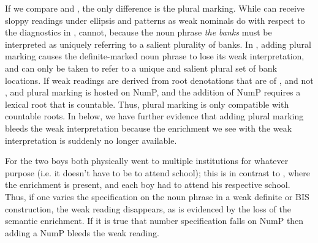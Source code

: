 \documentclass[output=paper,
modfonts
]{langscibook}
\begin{document}
\begin{exe}
\end{exe}

If we compare  and , the only difference is the plural marking. While  can receive sloppy readings under ellipsis and patterns as weak nominals do with respect to the diagnostics in ,  cannot, because the noun phrase \textit{the banks} must be interpreted as uniquely referring to a salient plurality of banks. In , adding plural marking causes the definite-marked noun phrase to lose its weak interpretation, and can only be taken to refer to a unique and salient plural set of bank locations. If weak readings are derived from root denotations that are  of , and not , and plural marking is hosted on NumP, and the addition of NumP requires a lexical root that is countable. Thus, plural marking is only compatible with countable roots. In  below, we have further evidence that adding plural marking bleeds the weak interpretation because the enrichment we see with the weak interpretation is suddenly no longer available. 

\begin{exe}
\end{exe}

For  the two boys both physically went to multiple institutions for whatever purpose (i.e. it doesn't have to be to attend school); this is in contrast to , where the enrichment is present, and each boy had to attend his respective school. Thus, if one varies the  specification on the noun phrase in a weak definite or BIS construction, the weak reading disappears, as is evidenced by the loss of the semantic enrichment. If it is true that number specification falls on NumP then adding a NumP bleeds the weak reading. 
\end{document}
